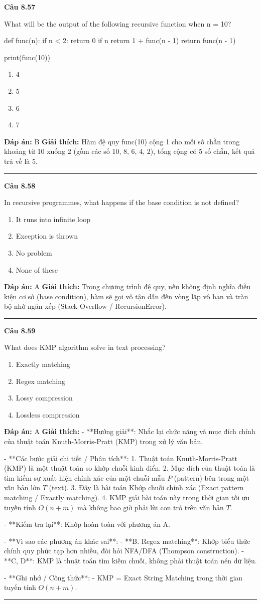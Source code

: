 \documentclass[11pt,a4paper]{article}
\newenvironment{question}[1]{%
  \par\vspace{1em}\noindent\textbf{\large Câu #1}\par\vspace{0.4em}
}{%
  \par\vspace{1em}\hrule\vspace{0.6em}
}
\newenvironment{choices}{%
  \begin{enumerate}[label=\textbf{\Alph*.},leftmargin=2.2em,itemsep=2pt,topsep=3pt]
}{%
  \end{enumerate}
}
\newcommand{\choice}{\item}
\newenvironment{codebox}{%
  \begin{tcolorbox}[colback=gray!8!white,colframe=gray!50!black,arc=1.5mm,boxrule=0.6pt,left=3mm,right=3mm,top=2.5mm,bottom=2.5mm]
  \ttfamily\small
}{%
  \end{tcolorbox}
}
\begin{document}
\begin{question}{8.57}
What will be the output of the following recursive function when n = 10?
\begin{codebox}
def func(n):
    if n < 2:
        return 0
    if n %
        return 1 + func(n - 1)
    return func(n - 1)

print(func(10))
\end{codebox}
\begin{choices}
\choice 4
\choice 5
\choice 6
\choice 7
\end{choices}
\textbf{Đáp án:} B
\textbf{Giải thích:} Hàm đệ quy func(10) cộng 1 cho mỗi số chẵn trong khoảng từ 10 xuống 2 (gồm các số 10, 8, 6, 4, 2), tổng cộng có 5 số chẵn, kết quả trả về là 5.
\end{question}

\begin{question}{8.58}
In recursive programmes, what happens if the base condition is not defined?
\begin{choices}
\choice It runs into infinite loop
\choice Exception is thrown
\choice No problem
\choice None of these
\end{choices}
\textbf{Đáp án:} A
\textbf{Giải thích:} Trong chương trình đệ quy, nếu không định nghĩa điều kiện cơ sở (base condition), hàm sẽ gọi vô tận dẫn đến vòng lặp vô hạn và tràn bộ nhớ ngăn xếp (Stack Overflow / RecursionError).
\end{question}

\begin{question}{8.59}
What does KMP algorithm solve in text processing?
\begin{choices}
\choice Exactly matching
\choice Regex matching
\choice Lossy compression
\choice Lossless compression
\end{choices}
\textbf{Đáp án:} A
\textbf{Giải thích:} - **Hướng giải**:
  Nhắc lại chức năng và mục đích chính của thuật toán Knuth-Morris-Pratt (KMP) trong xử lý văn bản.

- **Các bước giải chi tiết / Phân tích**:
  1. Thuật toán Knuth-Morris-Pratt (KMP) là một thuật toán so khớp chuỗi kinh điển.
  2. Mục đích của thuật toán là tìm kiếm sự xuất hiện chính xác của một chuỗi mẫu \(P\) (pattern) bên trong một văn bản lớn \(T\) (text).
  3. Đây là bài toán Khớp chuỗi chính xác (Exact pattern matching / Exactly matching).
  4. KMP giải bài toán này trong thời gian tối ưu tuyến tính \(O(n + m)\) mà không bao giờ phải lùi con trỏ trên văn bản \(T\).

- **Kiểm tra lại**:
  Khớp hoàn toàn với phương án A.

- **Vì sao các phương án khác sai**:
  - **B. Regex matching**: Khớp biểu thức chính quy phức tạp hơn nhiều, đòi hỏi NFA/DFA (Thompson construction).
  - **C, D**: KMP là thuật toán tìm kiếm chuỗi, không phải thuật toán nén dữ liệu.

- **Ghi nhớ / Công thức**:
  - KMP = Exact String Matching trong thời gian tuyến tính \(O(n + m)\).
\end{question}
\end{document}
